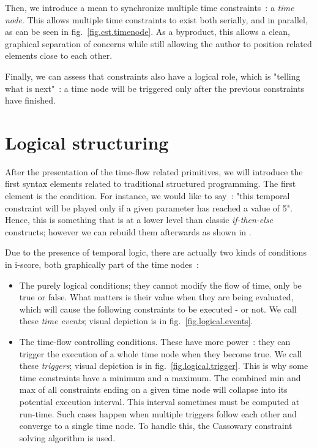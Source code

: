 \documentclass{sigchi}
\begin{document}
Then, we introduce a mean to synchronize multiple time constraints~: a \textit{time node}. 
This allows multiple time constraints to exist both serially, and in parallel, as can be seen in fig.~\ref{fig.cst.timenode}. 
As a byproduct, this allows a clean, graphical separation of concerns while still allowing the author to position related elements close to each other. %

Finally, we can assess that constraints also have a logical role, which is "telling what is next"~: a time node will be triggered only after the previous constraints have finished.

\section{Logical structuring}
\label{secstructured}
After the presentation of the time-flow related primitives, we will introduce the first syntax elements related to traditional structured programming.
The first element is the condition. For instance, we would like to say~: "this temporal constraint will be played only if a given parameter has reached a value of 5".
Hence, this is something that is at a lower level than classic \textit{if-then-else} constructs; however we can rebuild them afterwards as shown in \cite{celerier2015ossia}.

Due to the presence of temporal logic, there are actually two kinds of conditions in i-score, both graphically part of the time nodes~: 
\begin{itemize}
	\item The purely logical conditions; they cannot modify the flow of time, only be true or false. What matters is their value when they are being evaluated, which will cause the following constraints to be executed - or not. We call these \textit{time events}; visual depiction is in fig.~\ref{fig.logical.events}.
	\item The time-flow controlling conditions. These have more power~: they can trigger the execution of a whole time node when they become true. 
    We call these \textit{triggers}; visual depiction is in fig.~\ref{fig.logical.trigger}. 
    This is why some time constraints have a minimum and a maximum. The combined min and max of all constraints ending on a given time node will collapse into its potential execution interval. This interval sometimes must be computed at run-time. Such cases happen when multiple triggers follow each other and converge to a single time node. To handle this, the Cassowary constraint solving algorithm\cite{badros2001cassowary} is used.
\end{itemize}
\end{document}
